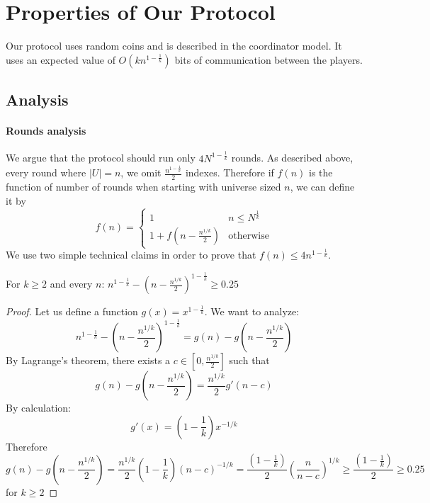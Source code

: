 \section{Properties of Our Protocol}
Our protocol uses random coins and is described in the coordinator model. It uses an expected value of $O(kn^{1-\frac{1}{k}})$ bits of communication between the players.
\subsection{Analysis}
\paragraph{Rounds analysis}
We argue that the protocol should run only $4N^{1-\frac{1}{k}}$ rounds. As described above, every round where $|U| = n$, we omit $\frac{n^{1-\frac{1}{k}}}{2}$ indexes. Therefore if $f(n)$ is the function of number of rounds when starting with universe sized $n$, we can define it by
    \begin{equation*}
        f(n) = \begin{cases}
               1               & n \leq N^{\frac{1}{k}}\\
               1 + f(n - \frac{n^{1/k}}{2}) & \text{otherwise}
           \end{cases}
    \end{equation*}
We use two simple technical claims in order to prove that $f(n) \leq 4n^{1-\frac{1}{k}}$.
\begin{claim}
    For $k \geq 2$ and every $n$: $n^{1 - \frac{1}{k}} - \left(n-\frac{n^{1/k}}{2}\right)^{1-\frac{1}{k}} \geq 0.25$
\end{claim}
\begin{proof}
    Let us define a function $g(x) = x^{1-\frac{1}{k}}$. We want to analyze:
    \begin{equation*}
        n^{1 - \frac{1}{k}} - \left(n-\frac{n^{1/k}}{2}\right)^{1-\frac{1}{k}} = g(n) - g\left (n-\frac{n^{1/k}}{2}\right)
    \end{equation*}
    By Lagrange's theorem, there exists a $c \in [0, \frac{n^{1/k}}{2}]$ such that
    \begin{equation*}
        g(n) - g\left( n-\frac{n^{1/k}}{2}\right) = \frac{n^{1/k}}{2} g'(n-c)
    \end{equation*}
    By calculation: 
    \begin{equation*}
        g'(x) = \left(1-\frac{1}{k}\right)x^{-1/k}
    \end{equation*}
    Therefore 
    \begin{equation*}
        g(n) - g\left( n-\frac{n^{1/k}}{2}\right) = \frac{n^{1/k}}{2} \left(1-\frac{1}{k}\right) (n-c)^{-1/k} = \frac{(1-\frac{1}{k})}{2} \left(\frac{n}{n-c}\right)^{1/k} \geq \frac{(1-\frac{1}{k})}{2} \geq 0.25
    \end{equation*}
    for $k \geq 2$ 
\end{proof}
